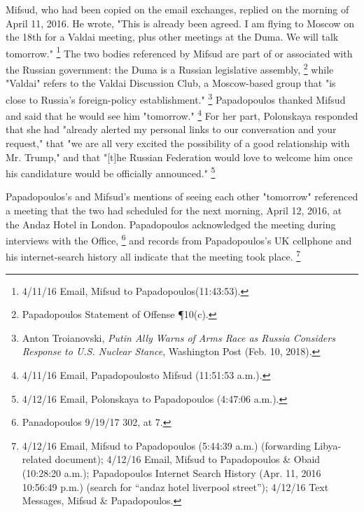 Mifsud, who had been copied on the email exchanges, replied on the morning of April 11, 2016.
He wrote, "This is already been agreed.
I am flying to Moscow on the 18th for a Valdai meeting, plus other meetings at the Duma.
We will talk tomorrow."%
\footnote{4/11/16 Email, Mifsud to Papadopoulos(11:43:53).}
The two bodies referenced by Mifsud are part of or associated with the Russian government: the Duma is a Russian legislative assembly,%
\footnote{Papadopoulos Statement of Offense \P 10(c).}
while "Valdai" refers to the Valdai Discussion Club, a Moscow-based group that "is close to Russia's foreign-policy establishment."%
\footnote{Anton Troianovski, \textit{Putin Ally Warns of Arms Race as Russia Considers Response to U.S. Nuclear Stance}, Washington Post (Feb. 10, 2018).}
Papadopoulos thanked Mifsud and said that he would see him "tomorrow."%
\footnote{4/11/16 Email, Papadopoulosto Mifsud (11:51:53 a.m.).}
For her part, Polonskaya responded that she had "already alerted my personal links to our conversation and your request," that "we are all very excited the possibility of a good relationship with Mr. Trump," and that "[t]he Russian Federation would love to welcome him once his candidature would be officially announced."%
\footnote{4/12/16 Email, Polonskaya to Papadopoulos (4:47:06 a.m.).}

Papadopoulos's and Mifsud's mentions of seeing each other "tomorrow" referenced a meeting that the two had scheduled for the next morning, April 12, 2016, at the Andaz Hotel in London.
Papadopoulos acknowledged the meeting during interviews with the Office,%
\footnote{Panadopoulos 9/19/17 302, at 7.}
and records from Papadopoulos's UK cellphone and his internet-search history all indicate that the meeting took place.%
\footnote{4/12/16 Email, Mifsud to Papadopoulos (5:44:39 a.m.) (forwarding Libya-related document); 4/12/16 Email, Mifsud to Papadopoulos \& Obaid (10:28:20 a.m.); Papadopoulos Internet Search History (Apr. 11, 2016 10:56:49 p.m.) (search for “andaz hotel liverpool street”); 4/12/16 Text Messages, Mifsud \& Papadopoulos.}

